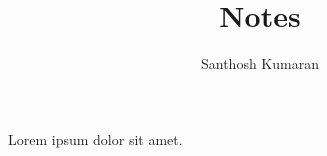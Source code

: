\documentclass{memoir}
\title{Notes}
\author{Santhosh Kumaran}
\date{}
\begin{document}
   
\frontmatter
\maketitle
\tableofcontents*

\mainmatter

\newpage
Lorem ipsum dolor sit amet.
\end{document}
